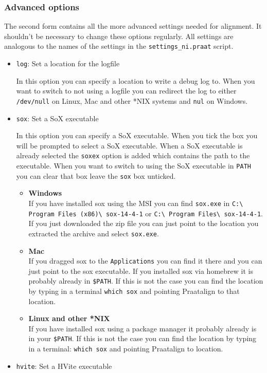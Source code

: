 \subsubsection{Advanced options}	
The second form contains all the more advanced settings needed for alignment.
It shouldn't be necessary to change these options regularly. All settings are
analogous to the names of the settings in the \texttt{settings\_ni.praat}
script.

\begin{itemize}
	\item \texttt{log}: %
		Set a location for the logfile

		In this option you can specify a location to write a debug log to. When you
		want to switch to not using a logfile you can redirect the log to either
		\texttt{/dev/null} on Linux, Mac and other *NIX systems and \texttt{nul} on
		Windows.
	\item \texttt{sox}: %
		Set a SoX executable

		In this option you can specify a SoX executable. When you tick the box you
		will be prompted to select a SoX executable. When a SoX executable is
		already selected the \texttt{soxex} option is added which contains the path
		to the executable. When you want to switch to using the SoX executable in
		\texttt{PATH} you can clear that box leave the \texttt{sox} box unticked.

		\begin{itemize}
			\item \textbf{Windows}\\
				If you have installed sox using the MSI you can find \texttt{sox.exe}
				in \texttt{C:\textbackslash%
				Program Files (x86)\textbackslash{} sox{-}14{-}4{-}1} or
				\texttt{C:\textbackslash{} Program Files\textbackslash{}
				sox{-}14{-}4{-}1}.
				If you just downloaded the zip file you can just point to the location
				you extracted the archive and select \texttt{sox.exe}.
			\item \textbf{Mac}\\
				If you dragged sox to the \texttt{Applications} you can find it there
				and you can just point to the sox executable. If you installed sox via
				homebrew it is probably already in \texttt{\$PATH}. If this is not the
				case you can find the location by typing in a terminal \texttt{which
				sox} and pointing Praatalign to that location.
			\item \textbf{Linux and other *NIX}\\
				If you have installed sox using a package manager it probably already
				is in your \texttt{\$PATH}. If this is not the case you can find the
				location by typing in a terminal: \texttt{which sox} and pointing
				Praatalign to location.
		\end{itemize}
	\item \texttt{hvite}: %
		Set a HVite executable


\end{itemize}
